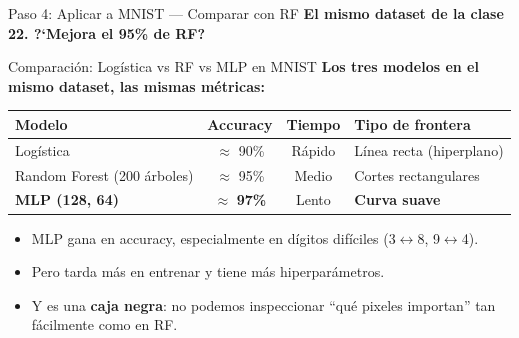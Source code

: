 \documentclass[aspectratio=169, 11pt]{beamer}
\begin{document}
\begin{frame}[fragile,shrink=18]{Paso 4: Aplicar a MNIST --- Comparar con RF}
  \vspace{-6pt}
  {\footnotesize\color{arcaDark}\bfseries
    El mismo dataset de la clase 22. ?`Mejora el 95\% de RF?}

  \vspace{4pt}
\end{frame}

\begin{frame}{Comparaci\'on: Log\'istica vs RF vs MLP en MNIST}
  \vspace{-4pt}
  {\footnotesize\color{arcaDark}\bfseries
    Los tres modelos en el mismo dataset, las mismas m\'etricas:}

  \vspace{8pt}
  {\footnotesize
  \begin{tabular}{@{}lccl@{}}
    \toprule
    \textbf{Modelo} & \textbf{Accuracy} & \textbf{Tiempo} & \textbf{Tipo de frontera} \\
    \midrule
    Log\'istica & $\approx$ 90\% & R\'apido & L\'inea recta (hiperplano) \\
    Random Forest (200 \'arboles) & $\approx$ 95\% & Medio & Cortes rectangulares \\
    \textbf{MLP (128, 64)} & $\approx$ \textbf{97\%} & Lento & \textbf{Curva suave} \\
    \bottomrule
  \end{tabular}
  }

  \vspace{6pt}
  {\footnotesize
  \begin{itemize}\setlength{\itemsep}{4pt}
    \item[{\color{codeGreen}\scriptsize\faArrowRight}]
      MLP gana en accuracy, especialmente en d\'igitos dif\'iciles
      (3$\leftrightarrow$8, 9$\leftrightarrow$4).
    \item[{\color{arcaRed}\scriptsize\faArrowRight}]
      Pero tarda m\'as en entrenar y tiene m\'as hiperpar\'ametros.
    \item[{\color{arcaRed}\scriptsize\faArrowRight}]
      Y es una \textbf{caja negra}: no podemos inspeccionar
      ``qu\'e pixeles importan'' tan f\'acilmente como en RF.
  \end{itemize}
  }
\end{frame}
\end{document}
